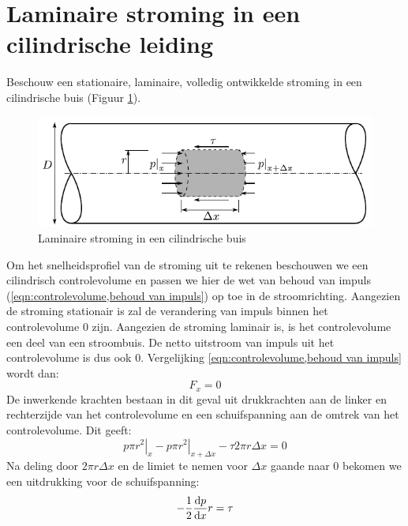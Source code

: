 	\section{Laminaire stroming in een cilindrische leiding}
	\label{sec:Laminaire stroming in een cilindrische leiding}
Beschouw een stationaire, laminaire, volledig ontwikkelde stroming in een cilindrische buis (Figuur \ref{fig:laminaire_stroming_in_buis}).
\begin{figure}[htb]
	\centering
	\includegraphics{fig/stroming_in_leidingen/Laminaire_stroming_in_buis}
	\caption{Laminaire stroming in een cilindrische buis}
	\label{fig:laminaire_stroming_in_buis}
\end{figure}
Om het snelheidsprofiel van de stroming uit te rekenen beschouwen we een cilindrisch controlevolume en passen we hier de wet van behoud van impuls (\ref{eqn:controlevolume,behoud van impuls}) op toe in de stroomrichting. Aangezien de stroming stationair is zal de verandering van impuls binnen het controlevolume $0$ zijn. Aangezien de stroming laminair is, is het controlevolume een deel van een stroombuis. De netto uitstroom van impuls uit het controlevolume is dus ook $0$. Vergelijking \ref{eqn:controlevolume,behoud van impuls} wordt dan:
\begin{equation}
	F_x = 0
\end{equation}
De inwerkende krachten bestaan in dit geval uit drukkrachten aan de linker en rechterzijde van het controlevolume en een schuifspanning aan de omtrek van het controlevolume. Dit geeft:
\begin{equation}
	\left. p \pi r^2\right|_{x} - \left. p \pi r^2\right|_{x+\Delta x} -  \tau 2 \pi r \Delta x = 0
\end{equation}
Na deling door $2\pi r \Delta x$ en de limiet te nemen voor $\Delta x$ gaande naar $0$ bekomen we een uitdrukking voor de schuifspanning:
\begin{equation}
	-\frac{1}{2} \frac{\mathrm{d} p}{\mathrm{d} x} r= \tau
	\label{eqn:drukgradient}
\end{equation}

